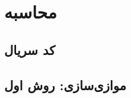 \documentclass{HW}
\begin{document}
\pagestyle{pages}
\thispagestyle{first_page}

\section{محاسبه }

\subsection{کد سریال}

\subsection{موازی‌سازی: روش اول}


%
\end{document}
